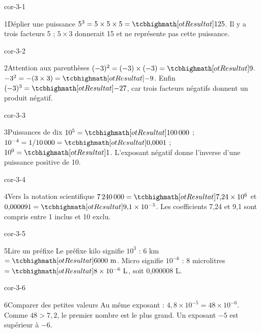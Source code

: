 \clearpage\pagestyle{otMain}\setlength{\otBlocEspacement}{2.5mm}\fontsize{11}{15}\selectfont{}
\begin{blocLivre}{cor-3-1}\begin{corrige}{1}{Déplier une puissance}
$5^3=5\times5\times5=\res{125}$. Il y a trois facteurs 5 ; $5\times3$ donnerait 15 et ne représente pas cette puissance.
\end{corrige}\end{blocLivre}
\begin{blocLivre}{cor-3-2}\begin{corrige}{2}{Attention aux parenthèses}
$(-3)^2=(-3)\times(-3)=\res9$. $-3^2=-(3\times3)=\res{-9}$. Enfin $(-3)^3=\res{-27}$, car trois facteurs négatifs donnent un produit négatif.
\end{corrige}\end{blocLivre}
\begin{blocLivre}{cor-3-3}\begin{corrige}{3}{Puissances de dix}
$10^5=\res{100\,000}$ ; $10^{-4}=1/10\,000=\res{0{,}0001}$ ; $10^0=\res1$. L’exposant négatif donne l’inverse d’une puissance positive de 10.
\end{corrige}\end{blocLivre}
\begin{blocLivre}{cor-3-4}\begin{corrige}{4}{Vers la notation scientifique}
$7\,240\,000=\res{7{,}24\times10^6}$ et $0{,}000091=\res{9{,}1\times10^{-5}}$. Les coefficients 7,24 et 9,1 sont compris entre 1 inclus et 10 exclu.
\end{corrige}\end{blocLivre}
\begin{blocLivre}{cor-3-5}\begin{corrige}{5}{Lire un préfixe}
Le préfixe kilo signifie $10^3$ : $6$ km $=\res{6000\ \mathrm m}$. Micro signifie $10^{-6}$ : $8$ microlitres $=\res{8\times10^{-6}\ \mathrm L}$, soit 0,000008 L.
\end{corrige}\end{blocLivre}
\begin{blocLivre}{cor-3-6}\begin{corrige}{6}{Comparer des petites valeurs}
Au même exposant : $4{,}8\times10^{-5}=48\times10^{-6}$. Comme $48>7{,}2$, le premier nombre est le plus grand. Un exposant $-5$ est supérieur à $-6$.
\end{corrige}\end{blocLivre}
